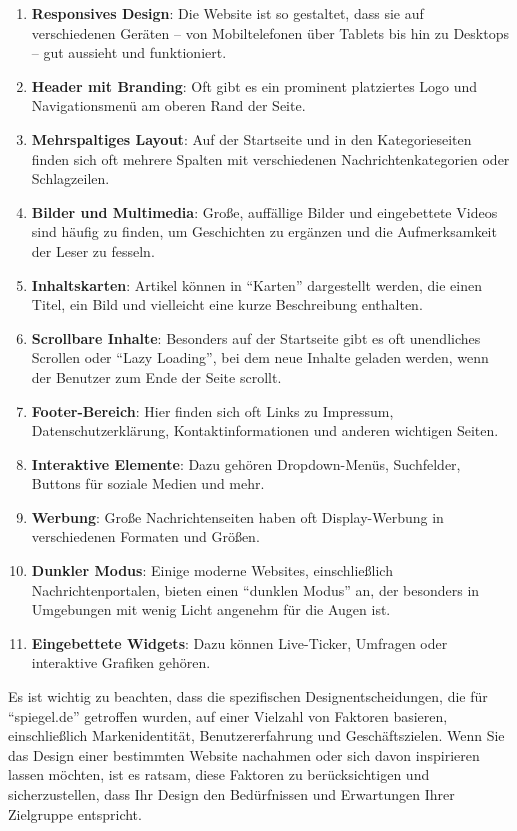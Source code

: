 \documentclass[12pt,a4paper]{scrartcl}
\begin{document}
\begin{enumerate}
\def\labelenumi{\arabic{enumi}.}
\item
  \textbf{Responsives Design}: Die Website ist so gestaltet, dass sie
  auf verschiedenen Geräten -- von Mobiltelefonen über Tablets bis hin
  zu Desktops -- gut aussieht und funktioniert.
\item
  \textbf{Header mit Branding}: Oft gibt es ein prominent platziertes
  Logo und Navigationsmenü am oberen Rand der Seite.
\item
  \textbf{Mehrspaltiges Layout}: Auf der Startseite und in den
  Kategorieseiten finden sich oft mehrere Spalten mit verschiedenen
  Nachrichtenkategorien oder Schlagzeilen.
\item
  \textbf{Bilder und Multimedia}: Große, auffällige Bilder und
  eingebettete Videos sind häufig zu finden, um Geschichten zu ergänzen
  und die Aufmerksamkeit der Leser zu fesseln.
\item
  \textbf{Inhaltskarten}: Artikel können in ``Karten'' dargestellt
  werden, die einen Titel, ein Bild und vielleicht eine kurze
  Beschreibung enthalten.
\item
  \textbf{Scrollbare Inhalte}: Besonders auf der Startseite gibt es oft
  unendliches Scrollen oder ``Lazy Loading'', bei dem neue Inhalte
  geladen werden, wenn der Benutzer zum Ende der Seite scrollt.
\item
  \textbf{Footer-Bereich}: Hier finden sich oft Links zu Impressum,
  Datenschutzerklärung, Kontaktinformationen und anderen wichtigen
  Seiten.
\item
  \textbf{Interaktive Elemente}: Dazu gehören Dropdown-Menüs,
  Suchfelder, Buttons für soziale Medien und mehr.
\item
  \textbf{Werbung}: Große Nachrichtenseiten haben oft Display-Werbung in
  verschiedenen Formaten und Größen.
\item
  \textbf{Dunkler Modus}: Einige moderne Websites, einschließlich
  Nachrichtenportalen, bieten einen ``dunklen Modus'' an, der besonders
  in Umgebungen mit wenig Licht angenehm für die Augen ist.
\item
  \textbf{Eingebettete Widgets}: Dazu können Live-Ticker, Umfragen oder
  interaktive Grafiken gehören.
\end{enumerate}

Es ist wichtig zu beachten, dass die spezifischen Designentscheidungen,
die für ``spiegel.de'' getroffen wurden, auf einer Vielzahl von Faktoren
basieren, einschließlich Markenidentität, Benutzererfahrung und
Geschäftszielen. Wenn Sie das Design einer bestimmten Website nachahmen
oder sich davon inspirieren lassen möchten, ist es ratsam, diese
Faktoren zu berücksichtigen und sicherzustellen, dass Ihr Design den
Bedürfnissen und Erwartungen Ihrer Zielgruppe entspricht.
\end{document}
